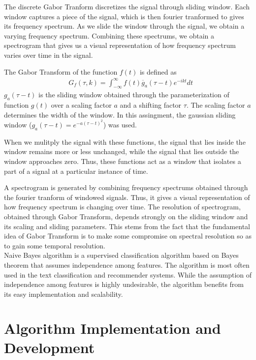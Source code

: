 \documentclass{article}
\begin{document}
The discrete Gabor Tranform discretizes the signal through sliding window. Each window captures a piece of the signal, which is then fourier tranformed to gives its frequency spectrum. As we slide the window through the signal, we obtain a varying frequency spectrum. Combining these spectrums, we obtain a spectrogram that gives us a visual representation of how frequency spectrum varies over time in the signal.

The Gabor Transform of the function $f(t)$ is defined as
\begin{align*}
&G_f(\tau, k) = \int_{-\infty}^{\infty} f(t)\overline{g}_a(\tau - t)e^{-ikt} dt 
\end{align*}
$g_a(\tau - t)$ is the sliding window obtained through the parameterization of function $g(t)$ over a scaling factor $a$ and a shifting factor $\tau$. The scaling factor $a$ determines the width of the window. In this assingment, the gaussian sliding window ($g_a(\tau - t) = e^{-a(\tau - t)^2}$) was used.

When we mulitply the signal with these functions, the signal that lies inside the window remains more or less unchanged, while the signal that lies outside the window approaches zero. Thus, these functions act as a window that isolates a part of a signal at a particular instance of time.

A spectrogram is generated by combining frequency spectrums obtained through the fourier tranform of windowed signals. Thus, it gives a visual representation of how frequency spectrum is changing over time. The resolution of spectrogram, obtained through Gabor Transform, depends strongly on the sliding window and its scaling and sliding parameters. This stems from the fact that the fundamental idea of Gabor Transform is to make some compromise on spectral resolution so as to gain some temporal resolution. \\

Naive Bayes algorithm is a supervised classification algorithm based on Bayes theorem that assumes independence among features. The algorithm is most often used in the text classification and recommender systems. While the assumption of independence among features is highly undesirable, the algorithm benefits from its easy implementation and scalability.


\section{Algorithm Implementation and Development}\label{Algorithm}
\end{document}
